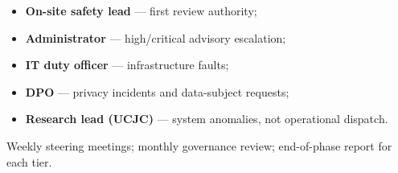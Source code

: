 \begin{itemize}[noitemsep]
  \item \textbf{On-site safety lead} --- first review authority;
  \item \textbf{Administrator} --- high/critical advisory escalation;
  \item \textbf{IT duty officer} --- infrastructure faults;
  \item \textbf{DPO} --- privacy incidents and data-subject requests;
  \item \textbf{Research lead (UCJC)} --- system anomalies, not operational dispatch.
\end{itemize}

Weekly steering meetings; monthly governance review; end-of-phase report for each tier.
